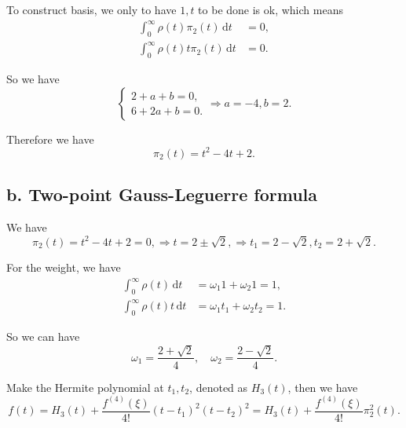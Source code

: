 \documentclass[a4paper]{article}
\begin{document}
To construct basis, we only to have $1, t$ to be done is ok, which means 
\begin{equation}
  \begin{aligned}
    \int_{0}^{\infty} \rho(t) \pi_2(t) \,\mathrm{d}t &= 0, \\
    \int_{0}^{\infty} \rho(t) t \pi_2(t) \,\mathrm{d}t &= 0.
  \end{aligned}
\end{equation}

So we have 
\begin{equation}
    \begin{cases}
      2 + a + b = 0, \\
      6 + 2a + b = 0. 
    \end{cases}
    \Rightarrow a = -4, b = 2.
\end{equation}

Therefore we have 
\begin{equation}
    \pi_2 (t) = t^2 - 4t + 2. 
\end{equation}

\subsection*{b. Two-point Gauss-Leguerre formula}
We have 
\begin{equation}
    \pi_2 (t) = t^2 - 4t + 2 = 0, \Rightarrow t = 2 \pm \sqrt{2}, \Rightarrow t_1 = 2 - \sqrt{2}, t_2 = 2 + \sqrt{2}.
\end{equation}

For the weight, we have 
\begin{equation}
    \begin{aligned}
        \int_{0}^{\infty} \rho(t) \,\mathrm{d}t &= \omega_1 1 + \omega_2 1 = 1, \\
        \int_{0}^{\infty} \rho(t) t \,\mathrm{d}t &= \omega_1 t_1 + \omega_2 t_2 = 1. 
    \end{aligned}
\end{equation}

So we can have 
\begin{equation}
    \omega_1 = \frac{2 + \sqrt{2}}{4}, \quad \omega_2 = \frac{2 - \sqrt{2}}{4}.
\end{equation}

Make the Hermite polynomial at $t_1, t_2$, denoted as $H_3(t)$, then we have 
\begin{equation}
    f(t) = H_3(t) + \frac{f^{(4)} (\xi)}{4!} (t - t_1)^2 (t - t_2)^2 = H_3(t) + \frac{f^{(4)} (\xi)}{4!} \pi_2^2(t).
\end{equation}
\end{document}
